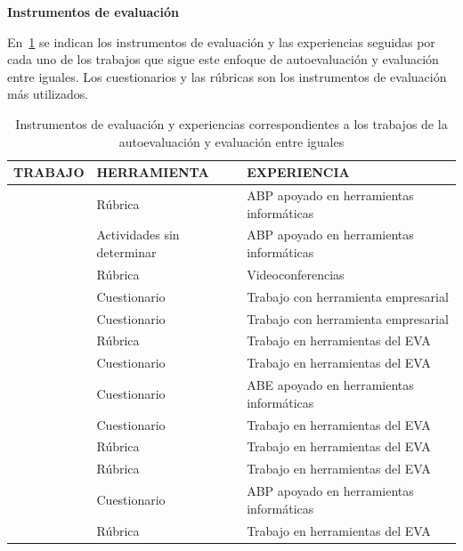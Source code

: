 \bigskip
\textbf{Instrumentos de evaluación}
\bigskip

En~\ref{tab:MetodosAuto} se indican los instrumentos de evaluación y las experiencias seguidas por cada uno de los trabajos que sigue este enfoque de autoevaluación y evaluación entre iguales. Los cuestionarios y las rúbricas son los instrumentos de evaluación más utilizados. 

\begin{table}
  \begin{center}
  \begin{tabular}{| c | m{4.5cm} | m{7.5cm} |}
    \hline
    TRABAJO & HERRAMIENTA & EXPERIENCIA \\
    \hline
    \hline
    \cite{lasa2013problem} & Rúbrica & ABP apoyado en herramientas informáticas \\
    \hline
    \cite{renau2010teaching} & Actividades sin determinar & ABP apoyado en herramientas informáticas \\
    \hline
    \cite{masip2013self} & Rúbrica & Videoconferencias \\
    \hline
    \cite{chang2009international} & Cuestionario & Trabajo con herramienta empresarial  \\
    \hline
    \cite{achcaoucaou2014competence} & Cuestionario & Trabajo con  herramienta empresarial  \\
    \hline
    \cite{arno2011promoting} & Rúbrica & Trabajo en herramientas del EVA\\
    \hline
    \cite{sevilla2012assessment} & Cuestionario & Trabajo en herramientas del EVA \\
    \hline
    \cite{ficapal2015learning} & Cuestionario & ABE apoyado en herramientas informáticas \\
    \hline
    \cite{ruizacarate2013soft} & Cuestionario & Trabajo en herramientas del EVA \\
    \hline
    \cite{piedra2010measuring} & Rúbrica & Trabajo en herramientas del EVA \\
    \hline
    \cite{carreras2013promotion} & Rúbrica & Trabajo en herramientas del EVA \\
    \hline
    \cite{martinez2014teamwork} & Cuestionario & ABP apoyado en herramientas informáticas \\
    \hline
    \cite{oliver2013graduate} & Rúbrica & Trabajo en herramientas del EVA \\
    \hline
  \end{tabular}
\end{center}
\caption{Instrumentos de evaluación y experiencias correspondientes a los trabajos de la autoevaluación y evaluación entre iguales}
\label{tab:MetodosAuto}
\end{table}

